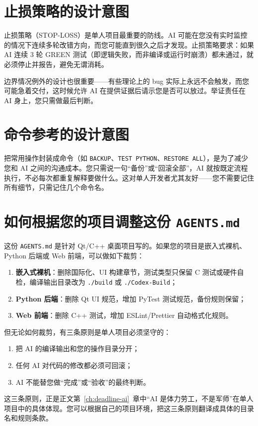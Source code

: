 \section{止损策略的设计意图}

止损策略（STOP-LOSS）是单人项目最重要的防线。AI 可能在您没有实时监控的情况下连续多轮改错方向，而您可能直到很久之后才发现。止损策略要求：如果 AI 连续 3 轮 GREEN 测试（即逻辑失败，而非编译或运行时崩溃）都未通过，就必须停止并报告，避免无谓消耗。

边界情况例外的设计也很重要——有些理论上的 bug 实际上永远不会触发，而您可能急着交付，这时候允许 AI 在提供证据后请示您是否可以放过。举证责任在 AI 身上，您只需做最后判断。

\section{命令参考的设计意图}

把常用操作封装成命令（如 \texttt{BACKUP}、\texttt{TEST PYTHON}、\texttt{RESTORE ALL}），是为了减少您和 AI 之间的沟通成本。您只需说一句“备份”或“回滚全部”，AI 就按既定流程执行，不必每次都重复解释要做什么。这对单人开发者尤其友好——您不需要记住所有细节，只需记住几个命令名。

\section{如何根据您的项目调整这份 \texttt{AGENTS.md}}

这份 \texttt{AGENTS.md} 是针对 Qt/C++ 桌面项目写的。如果您的项目是嵌入式裸机、Python 后端或 Web 前端，可以做如下裁剪：

\begin{enumerate}
	\item \textbf{嵌入式裸机}：删除国际化、UI 构建章节，测试类型只保留 C 测试或硬件自检，编译输出目录改为 \texttt{./build} 或 \texttt{./Codex-Build}；
	\item \textbf{Python 后端}：删除 Qt UI 规范，增加 PyTest 测试规范，备份规则保留；
	\item \textbf{Web 前端}：删除 C++ 测试，增加 ESLint/Prettier 自动格式化规则。
\end{enumerate}

但无论如何裁剪，有三条原则是单人项目必须坚守的：

\begin{enumerate}
	\item 把 AI 的编译输出和您的操作目录分开；
	\item 任何 AI 对代码的修改都必须可回滚；
	\item AI 不能替您做“完成”或“验收”的最终判断。
\end{enumerate}

这三条原则，正是正文第~\ref{ch:deadline-ai}~章中“AI 是体力劳工，不是军师”在单人项目中的具体体现。您可以根据自己的项目环境，把这三条原则翻译成具体的目录名和规则条款。